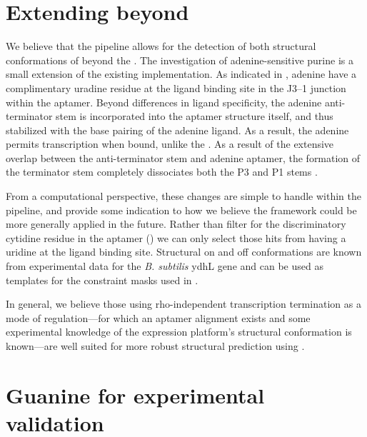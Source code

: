 \documentclass[11pt, oneside]{Thesis} %
\begin{document}
\section{Extending beyond \grbs}
\label{sec:rfinder:ext}

We believe that the \rfinder pipeline allows for the detection of both structural
conformations of \rbs beyond the \grb. The investigation of
adenine-sensitive purine \rbs is a small extension of the existing
implementation. As indicated in , adenine
\rbs have a complimentary uradine residue at the ligand binding site in
the J3--1 junction within the aptamer. Beyond differences in ligand specificity,
the adenine \rb anti-terminator stem is incorporated into the aptamer structure
itself, and thus stabilized with the base pairing of the adenine ligand. As a
result, the adenine \rb permits transcription when bound, unlike the \grb.
As a result of the extensive overlap between the anti-terminator stem and adenine
\rb aptamer, the formation of the terminator stem completely dissociates both the
P3 and P1 stems \citep{mandal2004a}.

From a computational perspective, these changes are simple to handle within the
\rfinder pipeline, and provide some indication to how we believe the framework
could be more generally applied in the future. Rather than filter for the
discriminatory cytidine residue in the \rb aptamer () we can only select those hits from \infernal having a uridine at the
ligand binding site. Structural on and off conformations are known from
experimental data for the {\em B. subtilis} ydhL gene \citep{mandal2004a} and can
be used as templates for the constraint masks used in .

In general, we believe those \rbs using rho-independent transcription
termination as a mode of regulation---for which an aptamer alignment exists and
some experimental knowledge of the expression platform's structural
conformation is known---are well suited for more robust structural
prediction using \rfinder.

\section{Guanine \rbs for experimental validation}
\label{sec:rfinder:grbValidationVarna}
\end{document}

